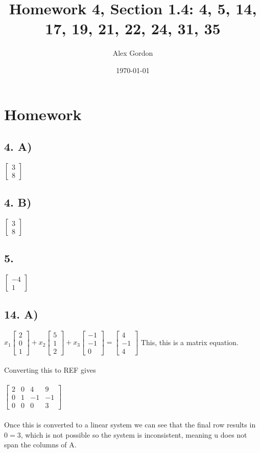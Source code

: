 \documentclass[12]{scrartcl}
\begin{document}
\title{Homework 4, Section 1.4: 4, 5, 14, 17, 19, 21, 22, 24, 31, 35}
\author{Alex Gordon}
\date{\today}
\maketitle
\section*{Homework}
\subsection*{4. A)}
$  \begin{bmatrix} 3 \\ 8 \end{bmatrix} $
\subsection*{4. B)}
$  \begin{bmatrix} 3 \\ 8 \end{bmatrix} $
\subsection*{5.}
$  \begin{bmatrix} -4\\1  \end{bmatrix} $
\subsection*{14. A)}
$ x_1  \begin{bmatrix} 2\\0\\1  \end{bmatrix} + x_2 \begin{bmatrix} 5\\1\\2  \end{bmatrix} + x_3 \begin{bmatrix} -1\\-1\\0  \end{bmatrix} = \begin{bmatrix} 4\\-1\\4  \end{bmatrix}$
This, this is a matrix equation. 
\\
\\
Converting this to REF gives 
\\
\\
$\begin{bmatrix} 2& 0& 4& 9 \\ 0& 1& -1& -1 \\ 0 & 0 & 0 & 3  \end{bmatrix}$
\\
\\
Once this is converted to a linear system we can see that the final row results in $0 = 3$, which is not possible so the system is inconsistent, meaning u does not span the columns of A. 
\end{document}

